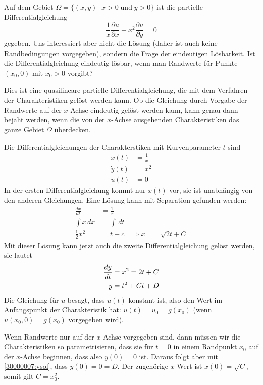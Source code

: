 Auf dem Gebiet $\Omega = \{ (x,y)\,|\, x>0\;\text{und}\;y > 0\}$
ist die partielle Differentialgleichung
\begin{equation}
\frac1x\frac{\partial u}{\partial x}+x^2\frac{\partial u}{\partial y}=0
\label{30000007:pdgl}
\end{equation}
gegeben. Uns interessiert aber nicht die Lösung (daher ist auch keine
Randbedingungen vorgegeben), sondern die Frage der eindeutigen Lösbarkeit.
Ist die Differentialgleichung eindeutig lösbar, wenn man Randwerte 
für Punkte $(x_0,0)$ mit $x_0>0$ vorgibt?

\begin{loesung}
Dies ist eine quasilineare partielle Differentialgleichung, die mit
dem Verfahren der Charakteristiken gelöst werden kann. Ob die Gleichung
durch Vorgabe der Randwerte auf der $x$-Achse eindeutig gelöst werden
kann, kann genau dann bejaht werden, wenn die von der $x$-Achse
ausgehenden Charakteristiken das ganze Gebiet $\Omega$
überdecken.

Die Differentialgleichungen der Charakterstiken mit Kurvenparameter $t$ sind 
\begin{align*}
\dot x(t)&=\frac1x\\
\dot y(t)&=x^2\\
\dot u(t)&=0
\end{align*}
In der ersten Differentialgleichung kommt nur $x(t)$ vor, sie ist unabhängig
von den anderen Gleichungen. Eine Lösung kann mit Separation gefunden werden:
\begin{align*}
\frac{dx}{dt}&=\frac1x\\
\int x\,dx&=\int \,dt\\
\frac12x^2&= t + c&\Rightarrow x&=\sqrt{2t + C}
\end{align*}
Mit dieser Lösung kann jetzt auch die zweite Differentialgleichung
gelöst werden, sie lautet
\begin{align}
\frac{dy}{dt}&=x^2=2t+C \notag \\
y&=t^2+Ct + D \label{30000007:ysol}
\end{align}
Die Gleichung für $u$ besagt, dass $u(t)$ konstant ist, also den
Wert im Anfangspunkt der Charakteristik hat: $u(t)=u_0=g(x_0)$ (wenn
$u(x_0,0)=g(x_0)$ vorgegeben wird).

Wenn Randwerte nur auf der $x$-Achse vorgegeben sind, dann müssen
wir die Charakteristiken so parametrisieren, dass sie für $t=0$
in einem Randpunkt $x_0$ auf der $x$-Achse beginnen, dass also
$y(0)=0$ ist. Daraus folgt aber mit \eqref{30000007:ysol}, dass
$y(0)=0=D$. Der zugehörige $x$-Wert ist $x(0)=\sqrt{C}$, somit
gilt $C=x_0^2$.


\end{loesung}
